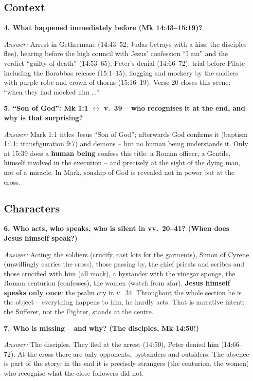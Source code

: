 \documentclass[12pt,a4paper]{article}
\newcommand{\frage}[1]{\par\vspace{0.7em}\noindent\textbf{#1}\par}
\newcommand{\antwort}[1]{\par\noindent\textit{Answer:} #1\par}
\begin{document}
\subsection*{Context}

\frage{4. What happened immediately before (Mk 14:43--15:19)?}
\antwort{Arrest in Gethsemane (14:43--52; Judas betrays with a kiss, the disciples flee), hearing before the high council with Jesus' confession ``I am'' and the verdict ``guilty of death'' (14:53--65), Peter's denial (14:66--72), trial before Pilate including the Barabbas release (15:1--15), flogging and mockery by the soldiers with purple robe and crown of thorns (15:16--19). Verse 20 closes this scene: ``when they had mocked him \ldots''}

\frage{5. ``Son of God'': Mk 1:1 $\leftrightarrow$ v.~39 -- who recognises it at the end, and why is that surprising?}
\antwort{Mark 1:1 titles Jesus ``Son of God''; afterwards God confirms it (baptism 1:11; transfiguration 9:7) and demons -- but no human being understands it. Only at 15:39 does a \textbf{human being} confess this title: a Roman officer, a Gentile, himself involved in the execution -- and precisely at the sight of the dying man, not of a miracle. In Mark, sonship of God is revealed not in power but at the cross.}

\subsection*{Characters}

\frage{6. Who acts, who speaks, who is silent in vv.~20--41? (When does Jesus himself speak?)}
\antwort{Acting: the soldiers (crucify, cast lots for the garments), Simon of Cyrene (unwillingly carries the cross), those passing by, the chief priests and scribes and those crucified with him (all mock), a bystander with the vinegar sponge, the Roman centurion (confesses), the women (watch from afar). \textbf{Jesus himself speaks only once}: the psalm cry in v.~34. Throughout the whole section he is the object -- everything happens to him, he hardly acts. That is narrative intent: the Sufferer, not the Fighter, stands at the centre.}

\frage{7. Who is missing -- and why? (The disciples, Mk 14:50!)}
\antwort{The disciples. They fled at the arrest (14:50), Peter denied him (14:66--72). At the cross there are only opponents, bystanders and outsiders. The absence is part of the story: in the end it is precisely strangers (the centurion, the women) who recognise what the close followers did not.}
\end{document}
